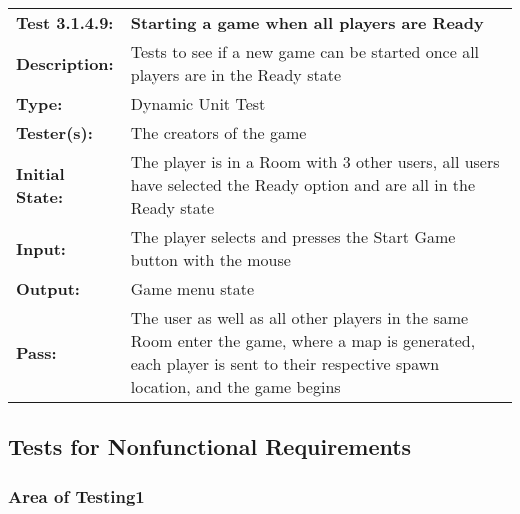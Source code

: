 \documentclass[12pt, titlepage]{article}
\begin{document}
\begin{mdframed}[linewidth=1pt]
\begin{tabularx}{\textwidth}{@{}p{3cm}X@{}}
{\bf Test 3.1.4.9:} & {\bf Starting a game when all players are Ready}\\[\baselineskip]
{\bf Description:} & Tests to see if a new game can be started once all players are in the Ready state\\[0.5\baselineskip]
{\bf Type:} & Dynamic Unit Test\\[0.5\baselineskip]
{\bf Tester(s):} & The creators of the game\\[0.5\baselineskip]
{\bf Initial State:} & The player is in a Room with 3 other users, all users have selected the Ready option and are all in the Ready state\\[0.5\baselineskip]
{\bf Input:} & The player selects and presses the Start Game button with the mouse \\[0.5\baselineskip]
{\bf Output:} & Game menu state\\[0.5\baselineskip]
{\bf Pass:} & The user as well as all other players in the same Room enter the game, where a map is generated, each player is sent to their respective spawn location, and the game begins
\end{tabularx}
\end{mdframed}

\subsection{Tests for Nonfunctional Requirements}
\subsubsection{Area of Testing1}
		
\end{document}
